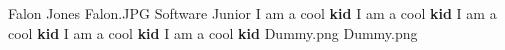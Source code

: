\insertbio
{Falon Jones}
{Falon.JPG}
{}
{Software}
{Junior}
{
I am a cool \textbf{kid}
I am a cool \textbf{kid}
I am a cool \textbf{kid}
I am a cool \textbf{kid}
I am a cool \textbf{kid}
}
{Dummy.png}
{Dummy.png}
